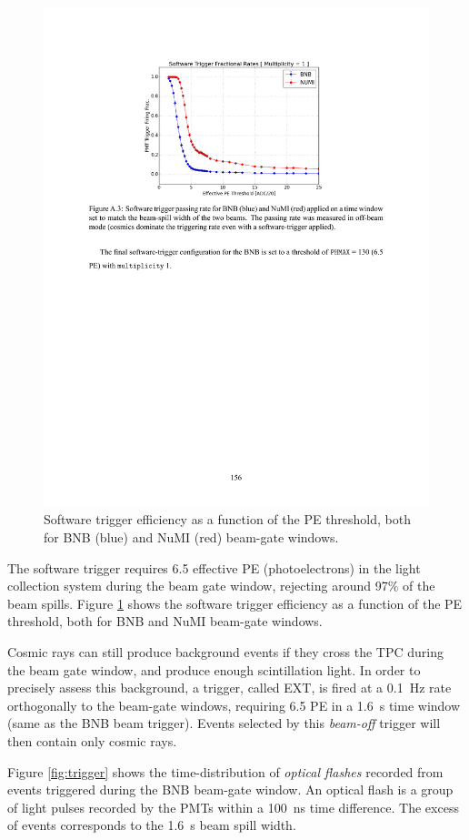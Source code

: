 \begin{figure}[htbp]
    \centering
    \includegraphics[width=0.85\linewidth]{figures/pmttrigger.pdf}
    \caption{Software trigger efficiency as a function of the PE threshold, both for BNB (blue) and NuMI (red) beam-gate windows.}
    \label{fig:pmttrigger}
\end{figure}

The software trigger requires 6.5 effective PE (photoelectrons) in the light collection system during the beam gate window, rejecting around 97\% of the beam spills. Figure \ref{fig:pmttrigger} shows the software trigger efficiency as a function of the PE threshold, both for BNB and NuMI beam-gate windows.

Cosmic rays can still produce background events if they cross the TPC during the beam gate window, and produce enough scintillation light. In order to precisely assess this background, a trigger, called EXT, is fired at a 0.1~Hz rate orthogonally to the beam-gate windows, requiring 6.5 PE in a 1.6~\si{\micro}s time window (same as the BNB beam trigger). Events selected by this \emph{beam-off} trigger will then contain only cosmic rays.

Figure \ref{fig:trigger} shows the time-distribution of \emph{optical flashes} recorded from events triggered during the BNB beam-gate window. An optical flash is a group of light pulses recorded by the PMTs within a 100~ns time difference. The excess of events corresponds to the 1.6~\si{\micro}s beam spill width. 

